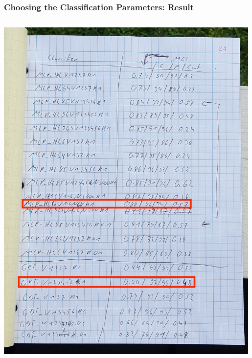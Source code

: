 \documentclass[xcolor=table, xcolor=dvipsnames]{beamer}
\begin{document}
\begin{frame}
  \frametitle{\hyperlink{con}{Choosing the Classification Parameters: Result}}
  \label{rocRes}
  \footnotesize
  
  \begin{columns}
    \begin{column}{5cm}
     \includegraphics[width=0.99\textwidth]{logEntry1.jpg}
    \end{column}
 

\end{columns}
\end{frame}
\end{document}
